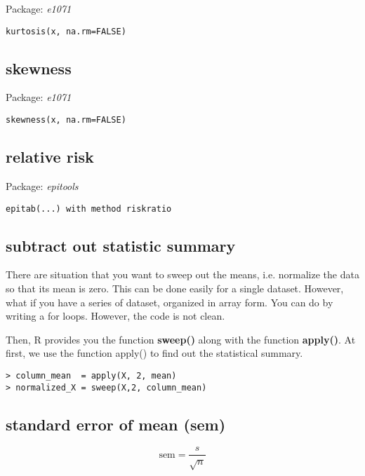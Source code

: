 Package: {\it e1071}


\begin{lstlisting}
kurtosis(x, na.rm=FALSE)
\end{lstlisting}

\subsection{skewness}
\label{sec:skewness}

Package: {\it e1071}

\begin{lstlisting}
skewness(x, na.rm=FALSE)
\end{lstlisting}

\subsection{relative risk}
\label{sec:relative-risk}

Package: {\it epitools}

\begin{lstlisting}
epitab(...) with method riskratio
\end{lstlisting}

\subsection{subtract out statistic summary}
\label{sec:subtr-out-stat}

There are situation that you want to sweep out the means,
i.e. normalize the data so that its mean is zero. This can be done
easily for a single dataset. However, what if you have a series of
dataset, organized in array form.  You can do by writing a for
loops. However, the code is not clean.

Then, R provides you the function {\bf sweep()} along with the
function {\bf apply()}. At first, we use the function apply() to find
out the statistical summary.

\begin{lstlisting}
> column_mean  = apply(X, 2, mean)
> normalized_X = sweep(X,2, column_mean)
\end{lstlisting}

\subsection{standard error of mean (sem)}
\label{sec:standard-error-sem}

\begin{equation}
  \label{eq:59}
  \text{sem} = \frac{s}{\sqrt{n}}
\end{equation}




